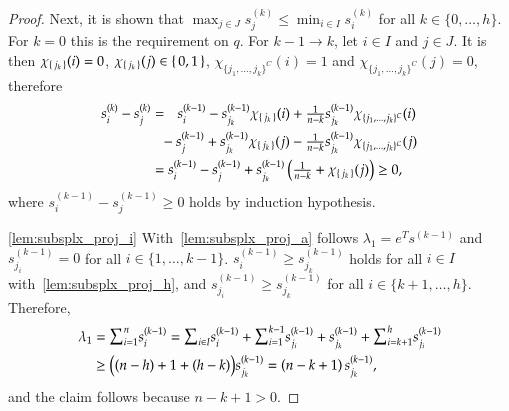 \documentclass[twoside,11pt]{article}
\newcommand{\0}{\mathcal{O}}
\newcommand{\transp}{^T}
\newcommand{\discint}[2]{\{#1,\dotsc,#2\}}
\newcommand{\inint}[2]{\in\discint{#1}{#2}}
\newcommand{\smallsum}{\scalebox{1.2}{$\sum$}}
\begin{document}
\begin{proof}
Next, it is shown that $\max_{j\in J}s^{(k)}_j \leq \min_{i\in I} s^{(k)}_i$ for all $k\inint{0}{h}$.
For $k = 0$ this is the requirement on $q$.
For $k - 1\to k$, let $i\in I$ and $j\in J$.
It is then $\chi_{\set{j_k}}(i) = 0$, $\chi_{\set{j_k}}(j)\in\set{0,1}$, $\chi_{\discint{j_1}{j_k}^C}(i) = 1$ and $\chi_{\discint{j_1}{j_k}^C}(j) = 0$, therefore
\begin{align*}
  s^{(k)}_i - s^{(k)}_j &=
  \phantom{-}s^{(k-1)}_i - s^{(k-1)}_{j_k}{\chi_{\set{j_k}}(i)} + \tfrac{1}{n-k}s^{(k-1)}_{j_k}{\chi_{\discint{j_1}{j_k}^C}(i)} \\
  &\phantom{=} -s^{(k-1)}_j + s^{(k-1)}_{j_k}\chi_{\set{j_k}}(j) - \tfrac{1}{n-k}s^{(k-1)}_{j_k}{\chi_{\discint{j_1}{j_k}^C}(j)}\\
  &= {s^{(k-1)}_i - s^{(k-1)}_j} + {s^{(k-1)}_{j_k}\left(\tfrac{1}{n-k} + \chi_{\set{j_k}}(j)\right)} \geq 0\text{,}
\end{align*}
where $s^{(k-1)}_i - s^{(k-1)}_j \geq 0$ holds by induction hypothesis.

\ref{lem:subsplx_proj_i}
With~\ref{lem:subsplx_proj_a} follows $\lambda_1 = e\transp s^{(k-1)}$ and $s^{(k-1)}_{j_i} = 0$ for all $i\inint{1}{k-1}$.
$s^{(k-1)}_i \geq s^{(k-1)}_{j_k}$ holds for all $i\in I$ with~\ref{lem:subsplx_proj_h},
and $s^{(k-1)}_{j_i} \geq s^{(k-1)}_{j_k}$ for all $i\inint{k+1}{h}$.
Therefore,
\begin{align*}
  \lambda_1
  &= \smallsum_{i=1}^ns^{(k-1)}_i
  = \smallsum_{i\in I}s^{(k-1)}_i + \smallsum_{i=1}^{k-1}s^{(k-1)}_{j_i} + s^{(k-1)}_{j_k} + \smallsum_{i=k+1}^hs^{(k-1)}_{j_i}\\
  &\geq \big((n-h) + 1 + (h - k)\big)s^{(k-1)}_{j_k} = \left(n - k + 1\right)s^{(k-1)}_{j_k}\text{,}
\end{align*}
and the claim follows because $n - k + 1 > 0$.


\end{proof}
\end{document}
